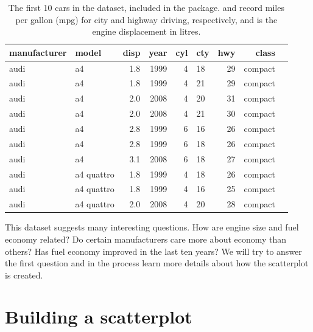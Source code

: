 \begin{table}
  \begin{center}
  \begin{tabular}{llrrrlrrl}
    \toprule
    manufacturer & model & disp & year & cyl & cty & hwy & class \\
    \midrule
    audi & a4         & 1.8 & 1999 & 4 & 18 & 29 & compact\\
    audi & a4         & 1.8 & 1999 & 4 & 21 & 29 & compact\\
    audi & a4         & 2.0 & 2008 & 4 & 20 & 31 & compact\\
    audi & a4         & 2.0 & 2008 & 4 & 21 & 30 & compact\\
    audi & a4         & 2.8 & 1999 & 6 & 16 & 26 & compact\\
    audi & a4         & 2.8 & 1999 & 6 & 18 & 26 & compact\\
    audi & a4         & 3.1 & 2008 & 6 & 18 & 27 & compact\\
    audi & a4 quattro & 1.8 & 1999 & 4 & 18 & 26 & compact\\
    audi & a4 quattro & 1.8 & 1999 & 4 & 16 & 25 & compact\\
    audi & a4 quattro & 2.0 & 2008 & 4 & 20 & 28 & compact\\
        \bottomrule
  \end{tabular}
  \end{center}
  \caption{The first 10 cars in the  dataset, included in the \ggplot package.   and  record miles per gallon (mpg) for city and highway driving, respectively, and  is the engine displacement in litres.}
  \label{tbl:mpg}
\end{table}

This dataset suggests many interesting questions.  How are engine size and fuel economy related?  Do certain manufacturers care more about economy than others? Has fuel economy improved in the last ten years?  We will try to answer the first question and in the process learn more details about how the scatterplot is created.

\section{Building a scatterplot}
\label{sec:simple-plot}

